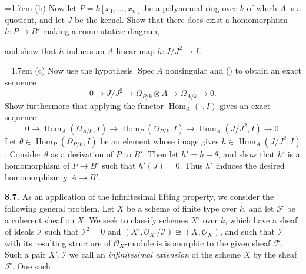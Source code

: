 {\noindent\hangindent=1.7em (b) Now let $P=k[x_1,\ldots,x_n]$ be a polynomial ring over $k$ of which $A$ is a quotient, and let $J$ be the kernel. Show that there does exist a homomorphism $h\colon P\to B'$ making a commutative diagram,\par
{\centering
{}\par
}
\noindent\hspace*{1.7em}and show that $h$ induces an $A$-linear map $\bar h\colon J/J^2\to I$.

\noindent\hangindent=1.7em (c) Now use the hypothesis $\operatorname{Spec} A$ nonsingular and () to obtain an exact sequence
\[
0\longrightarrow J/J^2\longrightarrow\Omega_{P/k}\otimes A\longrightarrow\Omega_{A/k}\longrightarrow0.
\]
Show furthermore that applying the functor $\operatorname{Hom}_A(\cdot,I)$ gives an exact sequence
\[
0\longrightarrow\operatorname{Hom}_A(\Omega_{A/k},I)\longrightarrow
\operatorname{Hom}_P(\Omega_{P/k},I)\longrightarrow\operatorname{Hom}_A(J/J^2,I)\longrightarrow0.
\]
Let $\theta\in\operatorname{Hom}_P(\Omega_{P/k},I)$ be an element whose image gives $\bar h\in\operatorname{Hom}_A(J/J^2,I)$. Consider $\theta$ as a derivation of $P$ to $B'$. Then let $h'=h-\theta$, and show that $h'$ is a homomorphism of $P\to B'$ such that $h'(J)=0$. Thus $h'$ induces the desired homomorphism $g\colon A\to B'$.

\smallskip
\noindent\hypertarget{ex-II-8.7}{}\textbf{8.7.} As an application of the infinitesimal lifting property, we consider the following general problem. Let $X$ be a scheme of finite type over $k$, and let $\mathcal F$ be a coherent sheaf on $X$. We seek to classify schemes $X'$ over $k$, which have a sheaf of ideals $\mathcal I$ such that $\mathcal I^2=0$ and $(X',\mathcal O_{X'}/\mathcal I)\cong(X,\mathcal O_X)$, and such that $\mathcal I$ with its resulting structure of $\mathcal O_X$-module is isomorphic to the given sheaf $\mathcal F$. Such a pair $X',\mathcal I$ we call an \emph{infinitesimal extension} of the scheme $X$ by the sheaf $\mathcal F$. One such}

